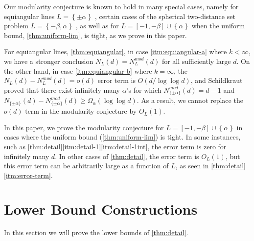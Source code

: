 \documentclass[reqno, 11pt]{amsart}
\theoremstyle{definition}
\theoremstyle{remark}
\newcommand{\set}[1]{\left\{ #1 \right\}}
\begin{document}
Our modularity conjecture is known to hold in many special cases, namely for equiangular lines $L = \set{\pm \alpha}$ \cite{JTYZZ21}, certain cases of the spherical two-distance set problem $L = \set{-\beta, \alpha}$ \cite{JTYZZ23, JP21+}, as well as for $L = [-1,-\beta] \cup \set{\alpha}$ when the uniform bound, \cref{thm:uniform-lim}, is tight, as we prove in this paper.

For equiangular lines, \cref{thm:equiangular}, in case \ref{itm:equiangular-a} where $k < \infty$, we have a stronger conclusion $N_L(d) = N_L^{mod}(d)$ for all sufficiently large $d$.
On the other hand, in case \ref{itm:equiangular-b} where $k = \infty$, the $N_L(d) - N_L^{mod}(d) = o(d)$ error term is $O(d/\log\log d)$, and Schildkraut \cite{Sch23+} proved that there exist infinitely many $\alpha$'s for which $N_{\{\pm \alpha\}}^{mod}(d) = d-1$ and $N_{\{\pm \alpha\}}(d) - N_{\{\pm \alpha\}}^{mod}(d) \ge  \Omega_\alpha(\log \log d)$. As a result, we cannot replace the $o(d)$ term in the modularity conjecture by $O_L(1)$.

In this paper, we prove the modularity conjecture for $L = [-1,-\beta]\cup\set{\alpha}$ in cases where the uniform bound (\cref{thm:uniform-lim}) is tight. In some instances, such as \cref{thm:detail}\ref{itm:detail-1}\ref{itm:detail-1int}, the error term is zero for infinitely many $d$. In other cases of \cref{thm:detail}, the error term is $O_L(1)$, but this error term can be arbitrarily large as a function of $L$, as seen in \cref{thm:detail}\ref{itm:error-term}.


\section{Lower Bound Constructions}\label{sec:lower}

In this section we will prove the lower bounds of \cref{thm:detail}.
\end{document}
